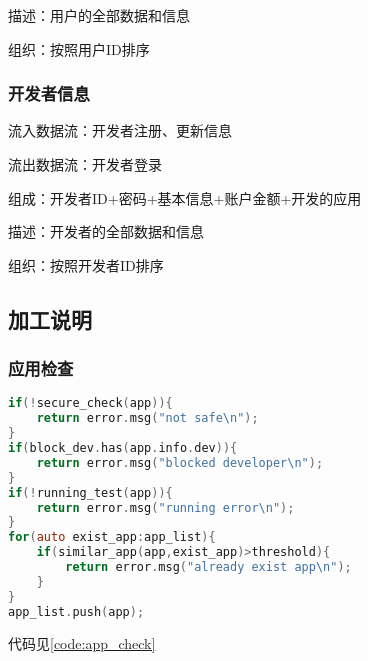 描述：用户的全部数据和信息

组织：按照用户ID排序

\subsubsection{开发者信息}

流入数据流：开发者注册、更新信息

流出数据流：开发者登录

组成：开发者ID+密码+基本信息+账户金额+开发的应用

描述：开发者的全部数据和信息

组织：按照开发者ID排序

\subsection{加工说明}
\subsubsection{应用检查}

\begin{lstlisting}[language=C, caption=示例代码, label={code:app_check}]
if(!secure_check(app)){
	return error.msg("not safe\n");
}
if(block_dev.has(app.info.dev)){
	return error.msg("blocked developer\n");
}
if(!running_test(app)){
	return error.msg("running error\n");
}
for(auto exist_app:app_list){
	if(similar_app(app,exist_app)>threshold){
		return error.msg("already exist app\n");
	}
}
app_list.push(app);

\end{lstlisting}

代码见\autoref{code:app_check} 


